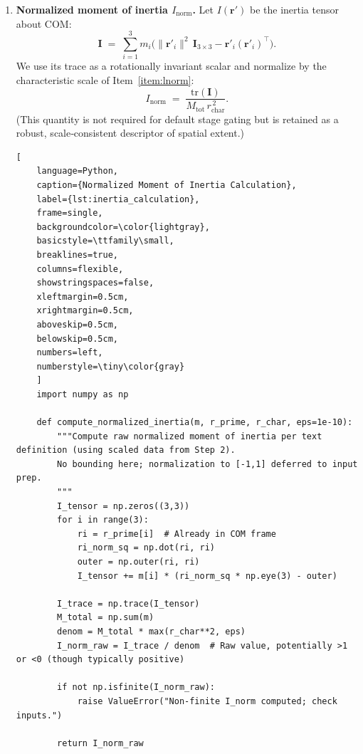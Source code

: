 \documentclass{article}
\begin{document}
\begin{enumerate}
    \item \textbf{Normalized moment of inertia $I_{\mathrm{norm}}$.}
    \label{item:inorm}
    Let $I(\mathbf r')$ be the inertia tensor about COM:
    \begin{equation}
    \mathbf I \;=\; \sum_{i=1}^{3} m_i \Big( \lVert \mathbf r'_i \rVert^2 \,\mathbf I_{3\times 3}
                                        - \mathbf r'_i (\mathbf r'_i)^{\!\top} \Big).
    \end{equation}
    We use its trace as a rotationally invariant scalar and normalize by the characteristic
    scale of Item~\ref{item:lnorm}:
    \begin{equation}
    I_{\mathrm{norm}} \;=\; \frac{\mathrm{tr}(\mathbf I)}{M_{\mathrm{tot}}\, r_{\mathrm{char}}^{\,2}}.
    \end{equation}
    (This quantity is not required for default stage gating but is retained as a robust,
    scale‑consistent descriptor of spatial extent.)

    \begin{lstlisting}[
    language=Python,
    caption={Normalized Moment of Inertia Calculation},
    label={lst:inertia_calculation},
    frame=single,
    backgroundcolor=\color{lightgray},
    basicstyle=\ttfamily\small,
    breaklines=true,
    columns=flexible,
    showstringspaces=false,
    xleftmargin=0.5cm,
    xrightmargin=0.5cm,
    aboveskip=0.5cm,
    belowskip=0.5cm,
    numbers=left,
    numberstyle=\tiny\color{gray}
    ]
    import numpy as np

    def compute_normalized_inertia(m, r_prime, r_char, eps=1e-10):
        """Compute raw normalized moment of inertia per text definition (using scaled data from Step 2).
        No bounding here; normalization to [-1,1] deferred to input prep.
        """
        I_tensor = np.zeros((3,3))
        for i in range(3):
            ri = r_prime[i]  # Already in COM frame
            ri_norm_sq = np.dot(ri, ri)
            outer = np.outer(ri, ri)
            I_tensor += m[i] * (ri_norm_sq * np.eye(3) - outer)
        
        I_trace = np.trace(I_tensor)
        M_total = np.sum(m)
        denom = M_total * max(r_char**2, eps)
        I_norm_raw = I_trace / denom  # Raw value, potentially >1 or <0 (though typically positive)
        
        if not np.isfinite(I_norm_raw):
            raise ValueError("Non-finite I_norm computed; check inputs.")
        
        return I_norm_raw
    \end{lstlisting}


\end{enumerate}
\end{document}
